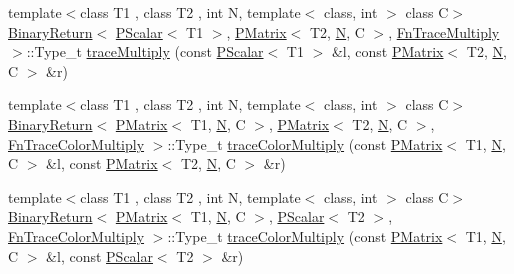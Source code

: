 \begin{DoxyCompactItemize}
\item 
{\footnotesize template$<$class T1 , class T2 , int N, template$<$ class, int $>$ class C$>$ }\\\mbox{\hyperlink{structENSEM_1_1BinaryReturn}{Binary\+Return}}$<$ \mbox{\hyperlink{classENSEM_1_1PScalar}{P\+Scalar}}$<$ T1 $>$, \mbox{\hyperlink{classENSEM_1_1PMatrix}{P\+Matrix}}$<$ T2, \mbox{\hyperlink{operator__name__util_8cc_a7722c8ecbb62d99aee7ce68b1752f337}{N}}, C $>$, \mbox{\hyperlink{structENSEM_1_1FnTraceMultiply}{Fn\+Trace\+Multiply}} $>$\+::Type\+\_\+t \mbox{\hyperlink{group__primmatrix_ga5b0cf4c87cad1bfd7dcad0a42d0b4ae6}{trace\+Multiply}} (const \mbox{\hyperlink{classENSEM_1_1PScalar}{P\+Scalar}}$<$ T1 $>$ \&l, const \mbox{\hyperlink{classENSEM_1_1PMatrix}{P\+Matrix}}$<$ T2, \mbox{\hyperlink{operator__name__util_8cc_a7722c8ecbb62d99aee7ce68b1752f337}{N}}, C $>$ \&r)
\item 
{\footnotesize template$<$class T1 , class T2 , int N, template$<$ class, int $>$ class C$>$ }\\\mbox{\hyperlink{structENSEM_1_1BinaryReturn}{Binary\+Return}}$<$ \mbox{\hyperlink{classENSEM_1_1PMatrix}{P\+Matrix}}$<$ T1, \mbox{\hyperlink{operator__name__util_8cc_a7722c8ecbb62d99aee7ce68b1752f337}{N}}, C $>$, \mbox{\hyperlink{classENSEM_1_1PMatrix}{P\+Matrix}}$<$ T2, \mbox{\hyperlink{operator__name__util_8cc_a7722c8ecbb62d99aee7ce68b1752f337}{N}}, C $>$, \mbox{\hyperlink{structENSEM_1_1FnTraceColorMultiply}{Fn\+Trace\+Color\+Multiply}} $>$\+::Type\+\_\+t \mbox{\hyperlink{group__primmatrix_ga017dba078c2a41f5ca2a8d2b934b20aa}{trace\+Color\+Multiply}} (const \mbox{\hyperlink{classENSEM_1_1PMatrix}{P\+Matrix}}$<$ T1, \mbox{\hyperlink{operator__name__util_8cc_a7722c8ecbb62d99aee7ce68b1752f337}{N}}, C $>$ \&l, const \mbox{\hyperlink{classENSEM_1_1PMatrix}{P\+Matrix}}$<$ T2, \mbox{\hyperlink{operator__name__util_8cc_a7722c8ecbb62d99aee7ce68b1752f337}{N}}, C $>$ \&r)
\item 
{\footnotesize template$<$class T1 , class T2 , int N, template$<$ class, int $>$ class C$>$ }\\\mbox{\hyperlink{structENSEM_1_1BinaryReturn}{Binary\+Return}}$<$ \mbox{\hyperlink{classENSEM_1_1PMatrix}{P\+Matrix}}$<$ T1, \mbox{\hyperlink{operator__name__util_8cc_a7722c8ecbb62d99aee7ce68b1752f337}{N}}, C $>$, \mbox{\hyperlink{classENSEM_1_1PScalar}{P\+Scalar}}$<$ T2 $>$, \mbox{\hyperlink{structENSEM_1_1FnTraceColorMultiply}{Fn\+Trace\+Color\+Multiply}} $>$\+::Type\+\_\+t \mbox{\hyperlink{group__primmatrix_ga34f5dfd94ab05f405e04e73c9e342aeb}{trace\+Color\+Multiply}} (const \mbox{\hyperlink{classENSEM_1_1PMatrix}{P\+Matrix}}$<$ T1, \mbox{\hyperlink{operator__name__util_8cc_a7722c8ecbb62d99aee7ce68b1752f337}{N}}, C $>$ \&l, const \mbox{\hyperlink{classENSEM_1_1PScalar}{P\+Scalar}}$<$ T2 $>$ \&r)

\end{DoxyCompactItemize}
